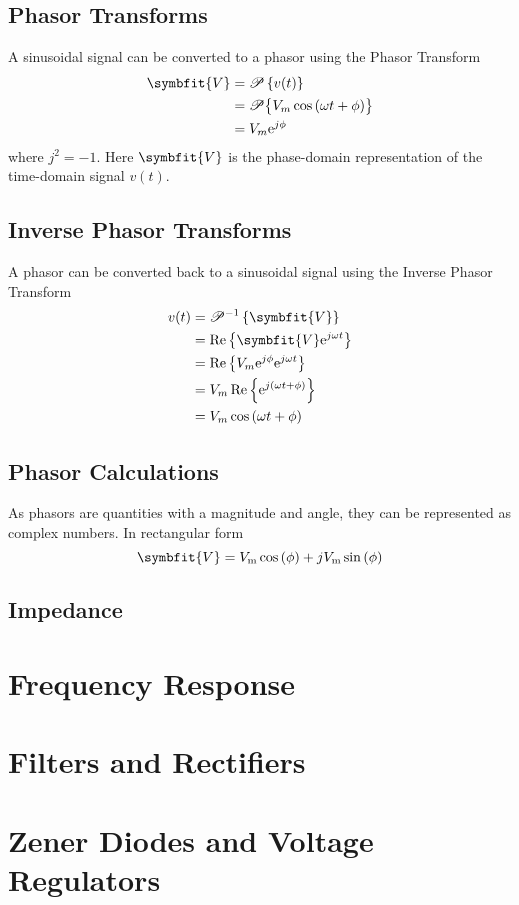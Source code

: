 \documentclass{article}
\begin{document}
\subsection{Phasor Transforms}
\begin{definition}
    A sinusoidal signal can be converted to a phasor using the Phasor Transform
    \begin{align*}
        \symbfit{V} &= \mathscr{P}\left\{ v(t) \right\} \\
        &= \mathscr{P}\bigl\{ V_m\cos{\left( \omega t + \phi \right)} \bigr\} \\
        &= V_m \e^{j\phi}
    \end{align*}
    where $j^2=-1$. Here $\symbfit{V}$ is the phase-domain representation of the
    time-domain signal $v(t)$.

\end{definition}
\subsection{Inverse Phasor Transforms}
\begin{definition}
    A phasor can be converted back to a sinusoidal signal using the Inverse Phasor Transform
    \begin{align*}
        v(t) &= \mathscr{P}^{-1}\left\{ \symbfit{V} \right\} \\
        &= \Re\left\{ \symbfit{V} \e^{j\omega t} \right\} \\
        &= \Re\left\{ V_m \e^{j\phi} \e^{j\omega t} \right\} \\
        &= V_m\Re\left\{ \e^{j\left( \omega t + \phi \right)} \right\} \\
        &= V_m\cos{\left( \omega t + \phi \right)} \\
    \end{align*}
\end{definition}
\subsection{Phasor Calculations}
As phasors are quantities with a magnitude and angle, they can be represented as complex numbers. 
In rectangular form
\begin{equation*}
    \symbfit{V} = V_{\mathrm{m}} \cos{\left( \phi \right)} + j V_{\mathrm{m}} \sin{\left( \phi \right)}
\end{equation*}
\subsection{Impedance}
\newpage
\section{Frequency Response}
\newpage
\section{Filters and Rectifiers}
\newpage
\section{Zener Diodes and Voltage Regulators}
\newpage
\end{document}

